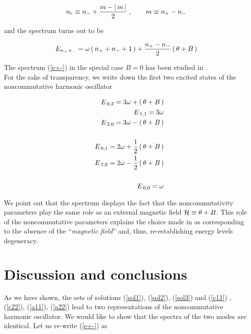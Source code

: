 \documentclass[a4paper,aps,prd,preprint]{revtex4}
\begin{document}
   \begin{equation}
   n_r\equiv n_- +{m-|\,m\,|\over 2} \ ,\qquad m\equiv n_+ - n_-
   \end{equation}
   
   and the spectrum turns out to be
   
   \begin{equation}
    E_{n_+\, n_-}= \omega\left(\, n_+ + n_- + 1\,\right) +{ n_+ - n_-\over 2}
    \left(\, \theta +B\,\right) \label{e+-}
    \end{equation}
    
   The spectrum (\ref{e+-}) in the special case $B=0$ has been studied 
   in \cite{gamb}.\\
   For the sake of transparency, we  write down 
   the first two excited states of the noncommutative harmonic oscillator 
   
   \begin{eqnarray}
   &&E_{\, 0 ,2}= 3\omega + \left(\, \theta +B\,\right)\\ 
   &&E_{\, 1 ,1}= 3\omega \\
   &&E_{\, 2 ,0}= 3\omega -\left(\, \theta +B\,\right)\\
   &&\nonumber\\
   &&E_{\, 0 ,1}= 2\omega +{1\over 2} \left(\, \theta +B\,\right)\\ 
   &&E_{\, 1 ,0}= 2\omega -{1\over 2} \left(\, \theta +B\,\right)\\
   &&\nonumber\\
   &&E_{\, 0 ,0}= \omega
   \end{eqnarray}
   
   We point out that the spectrum  displays the fact that  the noncommutativity
   parameters play the same role as an external magnetic field ${\cal H}\equiv
   \theta + B$.  This role of the noncommutative parameters explains the choice 
   made in \cite{greci} as corresponding to the absence 
   of the ``{\it magnetic field}''  and, thus, re-establishing energy levels
   degeneracy.
   
   \section{Discussion and conclusions}
  
   As we have shown, the sets of solutions (\ref{sol1}),
   (\ref{sol2}), (\ref{sol3}) and (\ref{c11}) ,  (\ref{c22}), (\ref{a11}),
   (\ref{a22}) lead to two representations of the noncommutative harmonic 
   oscillator.
   We would like to show that the spectra of the two modes are identical. 
   Let us re-write (\ref{e+-}) as
   
\end{document}
